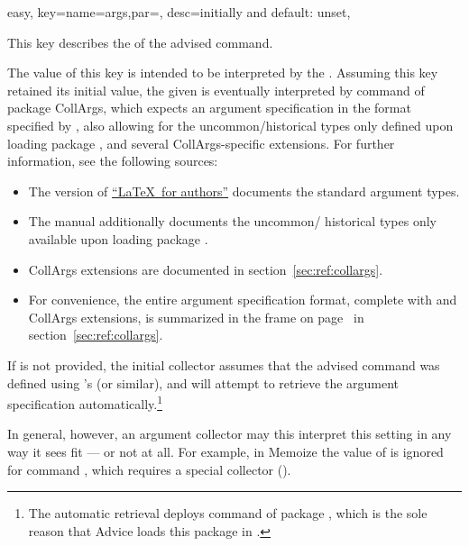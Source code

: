 \documentclass[a4paper,11pt]{article}
\begin{document}
\begin{doc}{easy,
    key={name=args,par=, desc=initially and default: unset},
  }

  This key describes the  of the advised command.

  The value of this key is intended to be interpreted by the
  .  Assuming this key retained its initial value, the
  given  is eventually interpreted by command
   of package CollArgs, which expects an argument
  specification in the format specified by , also allowing for
  the uncommon\slash historical types only defined upon loading package
  , and several CollArgs-specific extensions.  For further
  information, see the following sources:
  \begin{itemize}
  \item The  version
    of \href{https://www.latex-project.org/help/documentation/usrguide.pdf}
    {``\LaTeX\ for authors''} documents the standard argument types.
  \item The  manual additionally documents the uncommon\slash
    historical types only available upon loading package .
  \item CollArgs extensions are documented in section~\ref{sec:ref:collargs}.
  \item For convenience, the entire  argument specification
    format, complete with  and CollArgs extensions, is summarized
    in the frame on page~\pageref{tab:argspec} in
    section~\ref{sec:ref:collargs}.
  \end{itemize}

  If  is not provided, the initial collector
  assumes that the advised command was defined using 's
   (or similar), and will attempt to retrieve the
  argument specification automatically.\footnote{The automatic retrieval
    deploys command  of package ,
    which is the sole reason that Advice loads this package in .}
  
  In general, however, an argument collector may this interpret this setting 
  in any way it sees fit --- or not at all.  For example, in Memoize the value
  of  is ignored for command , which requires a special
  collector ().
  

\end{doc}
\end{document}
